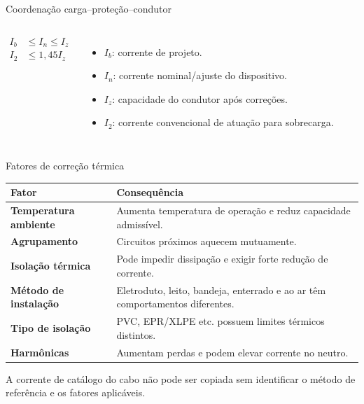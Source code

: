 \begin{frame}{Coordenação carga--proteção--condutor}
\small
\begin{columns}[T,onlytextwidth]
\begin{align*}
I_b &\le I_n \le I_z\\
I_2 &\le 1{,}45 I_z
\end{align*}
\begin{itemize}
\item $I_b$: corrente de projeto.
\item $I_n$: corrente nominal/ajuste do dispositivo.
\item $I_z$: capacidade do condutor após correções.
\item $I_2$: corrente convencional de atuação para sobrecarga.
\end{itemize}
\centering
{}
\end{columns}
\end{frame}

\begin{frame}{Fatores de correção térmica}
\small
\begin{tabularx}{\textwidth}{>{\bfseries}p{3.2cm}X}
\toprule
Fator & Consequência \\
\midrule
Temperatura ambiente & Aumenta temperatura de operação e reduz capacidade admissível. \\
Agrupamento & Circuitos próximos aquecem mutuamente. \\
Isolação térmica & Pode impedir dissipação e exigir forte redução de corrente. \\
Método de instalação & Eletroduto, leito, bandeja, enterrado e ao ar têm comportamentos diferentes. \\
Tipo de isolação & PVC, EPR/XLPE etc. possuem limites térmicos distintos. \\
Harmônicas & Aumentam perdas e podem elevar corrente no neutro. \\
\bottomrule
\end{tabularx}
\vspace{2mm}
\begin{caixaAt}
A corrente de catálogo do cabo não pode ser copiada sem identificar o método de referência e os fatores aplicáveis.
\end{caixaAt}
\end{frame}


